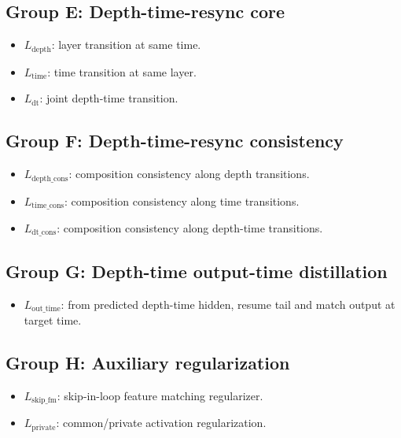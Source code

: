 \documentclass[11pt]{article}
\begin{document}
\subsection*{Group E: Depth-time-resync core}
\begin{itemize}[leftmargin=*]
  \item \textbf{\(L_{\text{depth}}\)}: layer transition at same time.
  \item \textbf{\(L_{\text{time}}\)}: time transition at same layer.
  \item \textbf{\(L_{\text{dt}}\)}: joint depth-time transition.
\end{itemize}

\subsection*{Group F: Depth-time-resync consistency}
\begin{itemize}[leftmargin=*]
  \item \textbf{\(L_{\text{depth\_cons}}\)}: composition consistency along depth transitions.
  \item \textbf{\(L_{\text{time\_cons}}\)}: composition consistency along time transitions.
  \item \textbf{\(L_{\text{dt\_cons}}\)}: composition consistency along depth-time transitions.
\end{itemize}

\subsection*{Group G: Depth-time output-time distillation}
\begin{itemize}[leftmargin=*]
  \item \textbf{\(L_{\text{out\_time}}\)}: from predicted depth-time hidden, resume tail and match output at target time.
\end{itemize}

\subsection*{Group H: Auxiliary regularization}
\begin{itemize}[leftmargin=*]
  \item \textbf{\(L_{\text{skip\_fm}}\)}: skip-in-loop feature matching regularizer.
  \item \textbf{\(L_{\text{private}}\)}: common/private activation regularization.
\end{itemize}
\end{document}
